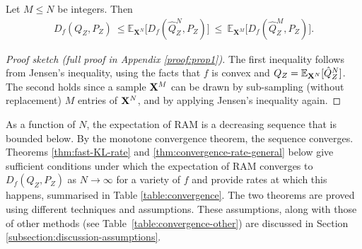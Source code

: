 \medskip

\begin{proposition}\label{prop:upper-bound}
Let $M \leq N$ be integers. Then
\begin{align}
\label{eq:our-estimate}
    D_f(Q_Z , P_Z) \ \leq 
    \mathbb{E}_{\mathbf{X}^N} \bigl[D_f(\hat{Q}_Z^N , P_Z)\bigr] \  \leq \ \mathbb{E}_{\mathbf{X}^M} \bigl[D_f(\hat{Q}_Z^M , P_Z)\bigr].
\end{align}
\end{proposition}
\begin{proof}[Proof sketch (full proof in Appendix \ref{proof:prop1})]
The first inequality follows from Jensen's inequality, using the facts that $f$ is convex and ${Q_Z = \mathbb{E}_{\mathbf{X}^N} [\hat{Q}_Z^N}]$.
The second holds since a sample ${\mathbf{X}^M}$ can be drawn by sub-sampling (without replacement) $M$ entries of ${\mathbf{X}^N}$, and by applying Jensen's inequality again.
\end{proof}

As a function of $N$, the expectation of RAM is a decreasing sequence that is bounded below.
By the monotone convergence theorem, the sequence converges.
Theorems \ref{thm:fast-KL-rate} and \ref{thm:convergence-rate-general} below give sufficient conditions under which the expectation of RAM converges to $D_f(Q_{Z} , P_Z)$ as $N\to\infty$ for a variety of $f$ and provide rates at which this happens, summarised in Table \ref{table:convergence}.
The two theorems are proved using different techniques and assumptions. 
These assumptions, along with those of other methods (see Table~\ref{table:convergence-other}) are discussed in Section \ref{subsection:discussion-assumptions}.



\medskip


